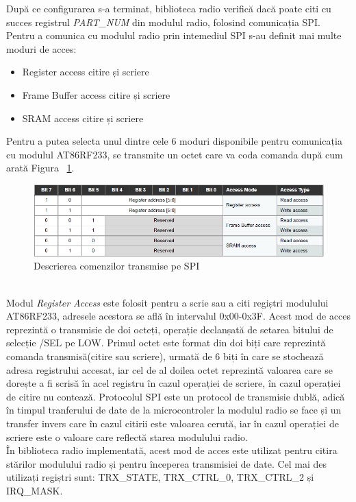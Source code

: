 \documentclass[12pt,a4paper]{report}
\begin{document}
După ce configurarea s-a terminat, biblioteca radio verifică dacă poate citi cu succes registrul \textit{PART\_NUM} din modulul radio, folosind comunicația SPI. \\
Pentru a comunica cu modulul radio prin intemediul SPI s-au definit mai multe moduri de acces:
\begin{itemize}
	\item Register access citire și scriere
	\item Frame Buffer access citire și scriere
	\item SRAM access citire și scriere
\end{itemize}
Pentru a putea selecta unul dintre cele 6 moduri disponibile pentru comunicația cu modulul AT86RF233, se transmite un octet care va coda comanda după cum arată Figura ~\ref{fig:commandbyte}.
\begin{figure}[h]
\centering
\includegraphics[scale=0.8]{pics/commandbyte.png}
  \caption{Descrierea comenzilor transmise pe SPI\cite{samr21ds}}
  \label{fig:commandbyte}
\end{figure}\\
Modul \textit{Register Access} este folosit pentru a scrie sau a citi regiștri modulului AT86RF233, adresele acestora se află în intervalul 0x00-0x3F. Acest mod de acces reprezintă o transmisie de doi octeți, operație declanșată de setarea bitului de selecție /SEL pe LOW. Primul octet este format din doi biți care reprezintă comanda transmisă(citire sau scriere), urmată de 6 biți în care se stochează adresa registrului accesat, iar cel de al doilea octet reprezintă valoarea care se dorește a fi scrisă în acel registru în cazul operației de scriere, în cazul operației de citire nu contează. 
Protocolul SPI este un protocol de transmisie dublă, adică în timpul tranferului de date de la microcontroler la modulul radio se face și un transfer invers care în cazul citirii este valoarea cerută, iar în cazul operației de scriere este o valoare care reflectă starea modulului radio.\\
În biblioteca radio implementată, acest mod de acces este utilizat pentru citira stărilor modulului radio și pentru începerea transmisiei de date. Cel mai des utilizați regiștri sunt: TRX\_STATE, TRX\_CTRL\_0, TRX\_CTRL\_2 și IRQ\_MASK\cite{samr21ds}.
\end{document}

